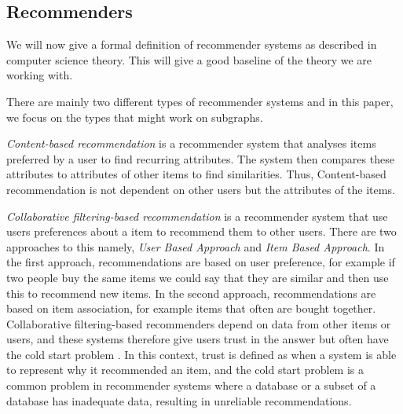 \subsection{Recommenders}
\label{Subsec:recommenders}
We will now give a formal definition of recommender systems as described in computer science theory. This will give a good baseline of the theory we are working with.

There are mainly two different  types of recommender systems and in this paper, we focus on the types that might work on subgraphs.

\textit{Content-based recommendation} is a recommender system that analyses items preferred by a user to find recurring attributes. The system then compares these attributes to attributes of other items to find similarities\cite{lu2015recommender}. Thus, Content-based recommendation is not dependent on other users but the attributes of the items.

\textit{Collaborative filtering-based recommendation} is a recommender system that use users preferences about a item to recommend them to other users. There are two approaches to this namely, \textit{User Based Approach} and \textit{Item Based Approach}. In the first approach, recommendations are based on user preference, for example if two people buy the same items we could say that they are similar and then use this to recommend new items. In the second approach, recommendations are based on item association, for example items that often are bought together.
Collaborative filtering-based recommenders depend on data from other items or users, and these systems therefore give users trust in the answer but often have the cold start problem \cite{lu2015recommender}. In this context, trust is defined as when a system is able to represent why it recommended an item, and the cold start problem is a common problem in recommender systems where a database or a subset of a database has inadequate data, resulting in unreliable recommendations\cite{Ricci2015}.
